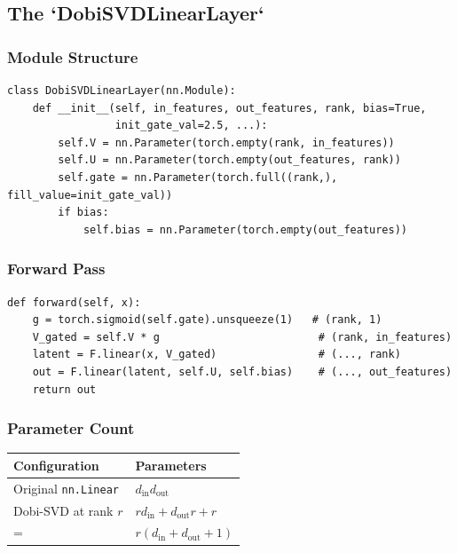 \subsection{The `DobiSVDLinearLayer`}

\subsubsection{Module Structure}

\begin{lstlisting}
class DobiSVDLinearLayer(nn.Module):
    def __init__(self, in_features, out_features, rank, bias=True,
                 init_gate_val=2.5, ...):
        self.V = nn.Parameter(torch.empty(rank, in_features))
        self.U = nn.Parameter(torch.empty(out_features, rank))
        self.gate = nn.Parameter(torch.full((rank,), fill_value=init_gate_val))
        if bias:
            self.bias = nn.Parameter(torch.empty(out_features))
\end{lstlisting}

\subsubsection{Forward Pass}

\begin{lstlisting}
def forward(self, x):
    g = torch.sigmoid(self.gate).unsqueeze(1)   # (rank, 1)
    V_gated = self.V * g                         # (rank, in_features)
    latent = F.linear(x, V_gated)                # (..., rank)
    out = F.linear(latent, self.U, self.bias)    # (..., out_features)
    return out
\end{lstlisting}

\subsubsection{Parameter Count}

\begin{table}[H]
\centering
\small
\begin{tabular}{ll}
\toprule
\textbf{Configuration} & \textbf{Parameters} \\
\midrule
Original \texttt{nn.Linear} & $d_\text{in} d_\text{out}$ \\
Dobi-SVD at rank $r$ & $r d_\text{in} + d_\text{out} r + r$ \\
= & $r(d_\text{in} + d_\text{out} + 1)$ \\
\bottomrule
\end{tabular}
\end{table}

